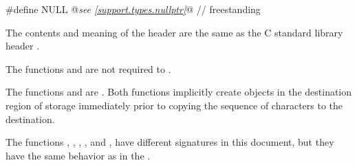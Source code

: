 \begin{codeblock}
#define NULL @\textit{see \ref{support.types.nullptr}}@                                                // freestanding
\end{codeblock}

\pnum
The contents and meaning of the header 
are the same as the C standard library header .

\pnum
The functions  and  are not required to
.

\pnum
{}%
%
The functions  and  are .
Both functions implicitly create objects
in the destination region of storage
immediately prior to copying the sequence of characters to the destination.

\pnum
\begin{note}
The functions
, , , , and ,
have different signatures in this document,
but they have the same behavior as in the .
\end{note}

